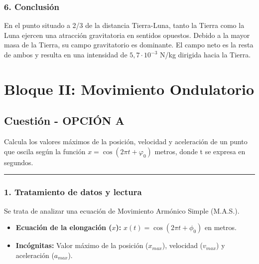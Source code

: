 \subsubsection*{6. Conclusión}
\begin{cajaconclusion}
En el punto situado a 2/3 de la distancia Tierra-Luna, tanto la Tierra como la Luna ejercen una atracción gravitatoria en sentidos opuestos. Debido a la mayor masa de la Tierra, su campo gravitatorio es dominante. El campo neto es la resta de ambos y resulta en una intensidad de $5,7 \cdot 10^{-3}$ N/kg dirigida hacia la Tierra.
\end{cajaconclusion}

\newpage

\section{Bloque II: Movimiento Ondulatorio}
\label{sec:ondas_2011_sep_ext}

\subsection{Cuestión  - OPCIÓN A}
\label{subsec:2A_2011_sep_ext}

\begin{cajaenunciado}
Calcula los valores máximos de la posición, velocidad y aceleración de un punto que oscila según la función $x=\cos(2\pi t+\varphi_{0})$ metros, donde t se expresa en segundos.
\end{cajaenunciado}
\hrule

\subsubsection*{1. Tratamiento de datos y lectura}
Se trata de analizar una ecuación de Movimiento Armónico Simple (M.A.S.).
\begin{itemize}
    \item \textbf{Ecuación de la elongación ($x$):} $x(t) = \cos(2\pi t + \phi_0)$ en metros.
    \item \textbf{Incógnitas:} Valor máximo de la posición ($x_{max}$), velocidad ($v_{max}$) y aceleración ($a_{max}$).
\end{itemize}

